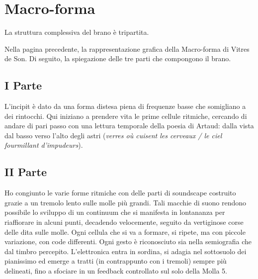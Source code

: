 
\section{Macro-forma}


La struttura complessiva del brano è tripartita. 

Nella pagina precedente, la rappresentazione grafica della Macro-forma di Vitres de Son. Di seguito, la spiegazione delle tre parti che compongono il brano.

\subsection*{I Parte}

L'incipit è dato da una forma distesa piena di frequenze basse che somigliano a dei rintocchi. Qui iniziano a prendere vita le prime cellule ritmiche, cercando di andare di pari passo con una lettura temporale della poesia di Artaud: dalla vista dal basso verso l'alto degli astri (\textit{verres où cuisent les cerveaux / le ciel fourmillant d'impudeurs}).


\subsection*{II Parte}

Ho congiunto le varie forme ritmiche con delle parti di soundscape costruito grazie a un tremolo lento sulle molle più grandi. Tali macchie di suono rendono possibile lo sviluppo di un continuum che si manifesta in lontananza per riaffiorare in alcuni punti, decadendo velocemente, seguito da vertiginose corse delle dita sulle molle. Ogni cellula che si va a formare, si ripete, ma con piccole variazione, con code differenti. Ogni gesto è riconosciuto sia nella semiografia che dal timbro percepito. L'elettronica entra in sordina, si adagia nel sottosuolo dei pianissimo ed emerge a tratti (in contrappunto con i tremoli) sempre più delineati, fino a sfociare in un feedback controllato sul solo della Molla 5. 


